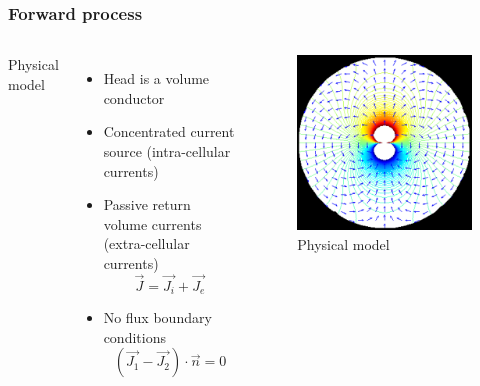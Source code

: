 \documentclass{beamer}
\begin{document}
\begin{frame}
    \frametitle{Forward process}
    \begin{columns}
        Physical model
        \begin{itemize}
            \item Head is a volume conductor
            \item Concentrated current source (intra-cellular currents)
            \item Passive return volume currents (extra-cellular currents)
                  \begin{equation*}
                      \vec{J} = \vec{J_{i}} + \vec{J_{e}}
                  \end{equation*}
            \item No flux boundary conditions
                  \begin{equation*}
                      (\vec{J_{1}} - \vec{J_{2}}) \cdot \vec{n} = 0
                  \end{equation*}
        \end{itemize}

        \begin{figure}[H]
            \centering
            \includegraphics[height=0.5\textheight]{physical_model.png}
            \caption{Physical model}
            \label{fig: Physical model}
        \end{figure}

    \end{columns}
\end{frame}
\end{document}
